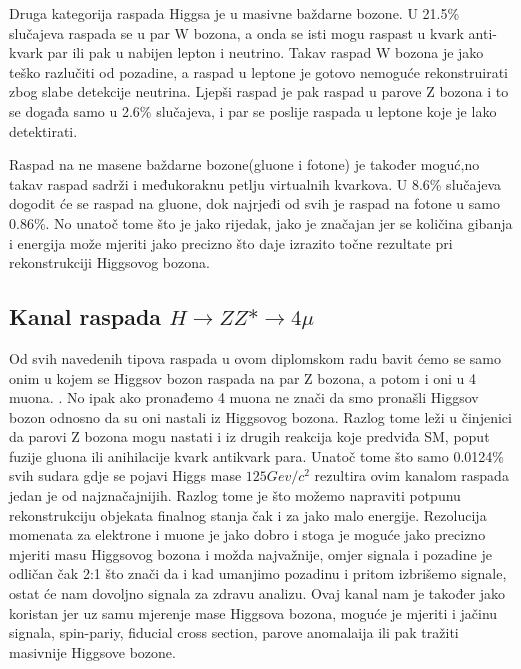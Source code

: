 \documentclass[12pt,a4paper,oneside]{article}
\begin{document}
\begin{linenumbers}
		Druga kategorija raspada Higgsa je u masivne baždarne bozone. U 21.5\% slučajeva raspada se u par W bozona, a onda se isti mogu raspast u kvark anti-kvark par ili pak u nabijen lepton i neutrino. Takav raspad W bozona je jako teško razlučiti od pozadine, a raspad u leptone je gotovo nemoguće rekonstruirati zbog slabe detekcije neutrina. 
		Ljepši raspad je pak raspad u parove Z bozona i to se događa samo u 2.6\% slučajeva, i par se poslije raspada u leptone koje je lako detektirati.
		
		Raspad na ne masene baždarne bozone(gluone i fotone) je također moguć,no takav raspad sadrži i međukoraknu petlju virtualnih kvarkova. U 8.6\% slučajeva dogodit će se raspad na gluone, dok najrjeđi od svih je raspad na fotone u samo 0.86\%. No unatoč tome što je jako rijedak, jako je značajan jer se količina gibanja i energija može mjeriti jako precizno što daje izrazito točne rezultate pri rekonstrukciji Higgsovog bozona.
		
		
		\subsection{Kanal raspada \begin{math}
			H \rightarrow ZZ* \rightarrow 4\mu \end{math}}
		Od svih navedenih tipova raspada u ovom diplomskom radu bavit ćemo se samo onim u kojem se Higgsov bozon raspada na par Z bozona, a potom i oni u 4 muona. . No ipak ako pronađemo 4 muona ne znači da smo pronašli Higgsov bozon odnosno da su oni nastali iz Higgsovog bozona. Razlog tome leži u činjenici da parovi Z bozona mogu nastati i iz drugih reakcija koje predviđa SM, poput fuzije gluona ili anihilacije kvark antikvark para.
		Unatoč tome što samo 0.0124\% svih sudara gdje se pojavi Higgs mase \begin{math}
		125 Gev/c^2
		\end{math} rezultira ovim kanalom raspada jedan je od najznačajnijih. Razlog tome je što možemo napraviti potpunu rekonstrukciju objekata finalnog stanja čak i za jako malo energije. Rezolucija momenata za elektrone i muone je jako dobro i stoga je moguće jako precizno mjeriti masu Higgsovog bozona i možda najvažnije, omjer signala i pozadine je odličan čak 2:1 što znači da i kad umanjimo pozadinu i pritom izbrišemo signale, ostat će nam dovoljno signala za zdravu analizu. Ovaj kanal nam je također jako koristan jer uz samu mjerenje mase Higgsova bozona, moguće je mjeriti i jačinu signala, spin-pariy, fiducial cross section, parove anomalaija ili pak tražiti masivnije Higgsove bozone.
		

\end{linenumbers}
\end{document}
